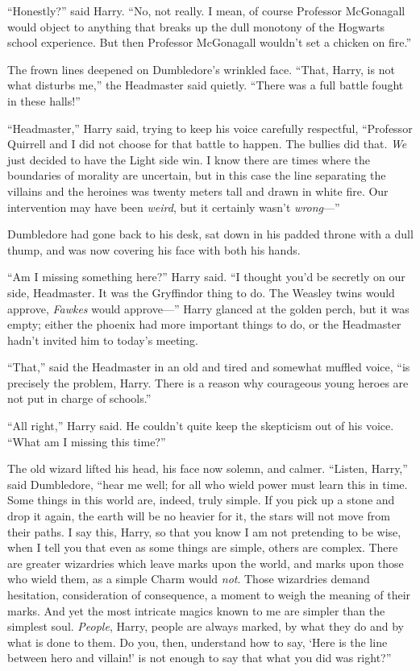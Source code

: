 ``Honestly?'' said Harry. ``No, not really. I mean, of course Professor
McGonagall would object to anything that breaks up the dull monotony of
the Hogwarts school experience. But then Professor McGonagall wouldn't
set a chicken on fire.''

The frown lines deepened on Dumbledore's wrinkled face. ``That, Harry,
is not what disturbs me,'' the Headmaster said quietly. ``There was a
full battle fought in these halls!''

``Headmaster,'' Harry said, trying to keep his voice carefully
respectful, ``Professor Quirrell and I did not choose for that battle to
happen. The bullies did that. \emph{We} just decided to have the Light
side win. I know there are times where the boundaries of morality are
uncertain, but in this case the line separating the villains and the
heroines was twenty meters tall and drawn in white fire. Our
intervention may have been \emph{weird}, but it certainly wasn't
\emph{wrong}---''

Dumbledore had gone back to his desk, sat down in his padded throne with
a dull thump, and was now covering his face with both his hands.

``Am I missing something here?'' Harry said. ``I thought you'd be
secretly on our side, Headmaster. It was the Gryffindor thing to do. The
Weasley twins would approve, \emph{Fawkes} would approve---'' Harry
glanced at the golden perch, but it was empty; either the phoenix had
more important things to do, or the Headmaster hadn't invited him to
today's meeting.

``That,'' said the Headmaster in an old and tired and somewhat muffled
voice, ``is precisely the problem, Harry. There is a reason why
courageous young heroes are not put in charge of schools.''

``All right,'' Harry said. He couldn't quite keep the skepticism out of
his voice. ``What am I missing this time?''

The old wizard lifted his head, his face now solemn, and calmer.
``Listen, Harry,'' said Dumbledore, ``hear me well; for all who wield
power must learn this in time. Some things in this world are, indeed,
truly simple. If you pick up a stone and drop it again, the earth will
be no heavier for it, the stars will not move from their paths. I say
this, Harry, so that you know I am not pretending to be wise, when I
tell you that even as some things are simple, others are complex. There
are greater wizardries which leave marks upon the world, and marks upon
those who wield them, as a simple Charm would \emph{not}. Those
wizardries demand hesitation, consideration of consequence, a moment to
weigh the meaning of their marks. And yet the most intricate magics
known to me are simpler than the simplest soul. \emph{People}, Harry,
people are always marked, by what they do and by what is done to them.
Do you, then, understand how to say, `Here is the line between hero and
villain!' is not enough to say that what you did was right?''

